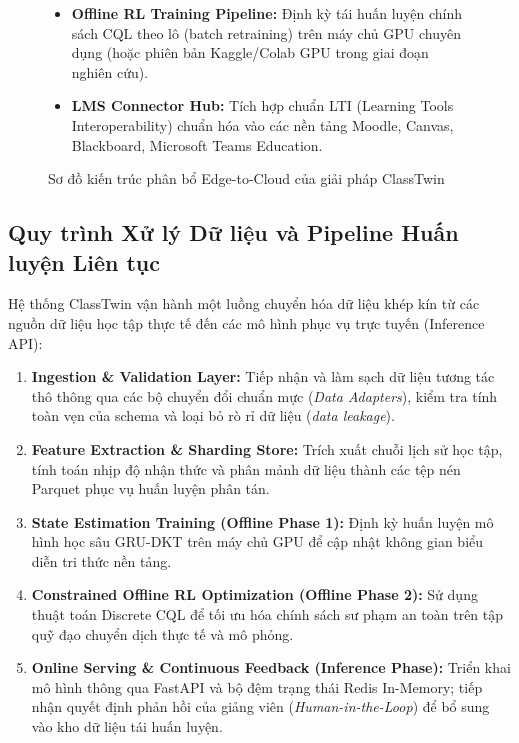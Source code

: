 \begin{figure}[htbp]
\begin{tcolorbox}[colback=white, colframe=TealPrimary, boxrule=1pt, arc=3pt, width=0.98\textwidth]
\begin{itemize}[leftmargin=1.5em]
      \item \textbf{Offline RL Training Pipeline:} Định kỳ tái huấn luyện chính sách CQL theo lô (batch retraining) trên máy chủ GPU chuyên dụng (hoặc phiên bản Kaggle/Colab GPU trong giai đoạn nghiên cứu).
      \item \textbf{LMS Connector Hub:} Tích hợp chuẩn LTI (Learning Tools Interoperability) chuẩn hóa vào các nền tảng Moodle, Canvas, Blackboard, Microsoft Teams Education.
    \end{itemize}
  \end{tcolorbox}
  \caption{Sơ đồ kiến trúc phân bổ Edge-to-Cloud của giải pháp ClassTwin}\label{fig:architecture}
\end{figure}

\subsection{Quy trình Xử lý Dữ liệu và Pipeline Huấn luyện Liên tục}\label{subsec:training-pipeline}
Hệ thống ClassTwin vận hành một luồng chuyển hóa dữ liệu khép kín từ các nguồn dữ liệu học tập thực tế đến các mô hình phục vụ trực tuyến (Inference API):
\begin{enumerate}[label=\textbf{\arabic*.}]
  \item \textbf{Ingestion \& Validation Layer:} Tiếp nhận và làm sạch dữ liệu tương tác thô thông qua các bộ chuyển đổi chuẩn mực (\textit{Data Adapters}), kiểm tra tính toàn vẹn của schema và loại bỏ rò rỉ dữ liệu (\textit{data leakage}).
  \item \textbf{Feature Extraction \& Sharding Store:} Trích xuất chuỗi lịch sử học tập, tính toán nhịp độ nhận thức và phân mảnh dữ liệu thành các tệp nén Parquet phục vụ huấn luyện phân tán.
  \item \textbf{State Estimation Training (Offline Phase 1):} Định kỳ huấn luyện mô hình học sâu GRU-DKT trên máy chủ GPU để cập nhật không gian biểu diễn tri thức nền tảng.
  \item \textbf{Constrained Offline RL Optimization (Offline Phase 2):} Sử dụng thuật toán Discrete CQL để tối ưu hóa chính sách sư phạm an toàn trên tập quỹ đạo chuyển dịch thực tế và mô phỏng.
  \item \textbf{Online Serving \& Continuous Feedback (Inference Phase):} Triển khai mô hình thông qua FastAPI và bộ đệm trạng thái Redis In-Memory; tiếp nhận quyết định phản hồi của giảng viên (\textit{Human-in-the-Loop}) để bổ sung vào kho dữ liệu tái huấn luyện.
\end{enumerate}

